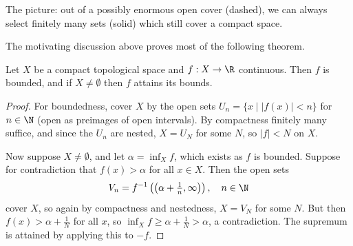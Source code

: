 \begin{center}
\end{center}

The picture: out of a possibly enormous open cover (dashed), we can always select finitely many sets (solid) which still cover a compact space.

The motivating discussion above proves most of the following theorem.

\begin{theorem}\label{thm:evt}
    Let $X$ be a compact topological space and $f: X \rightarrow \R$ continuous. Then $f$ is bounded, and if $X \neq \emptyset$ then $f$ attains its bounds.
\end{theorem}
\begin{proof}
    For boundedness, cover $X$ by the open sets $U_n = \{x \mid |f(x)| < n\}$ for $n \in \N$ (open as preimages of open intervals). By compactness finitely many suffice, and since the $U_n$ are nested, $X = U_N$ for some $N$, so $|f| < N$ on $X$.

    Now suppose $X \neq \emptyset$, and let $\alpha = \inf_X f$, which exists as $f$ is bounded. Suppose for contradiction that $f(x) > \alpha$ for all $x \in X$. Then the open sets
    $$
    V_n = f^{-1}\left(\left(\alpha + \tfrac{1}{n}, \infty\right)\right), \quad n \in \N
    $$
    cover $X$, so again by compactness and nestedness, $X = V_N$ for some $N$. But then $f(x) > \alpha + \frac{1}{N}$ for all $x$, so $\inf_X f \geq \alpha + \frac{1}{N} > \alpha$, a contradiction. The supremum is attained by applying this to $-f$.
\end{proof}


